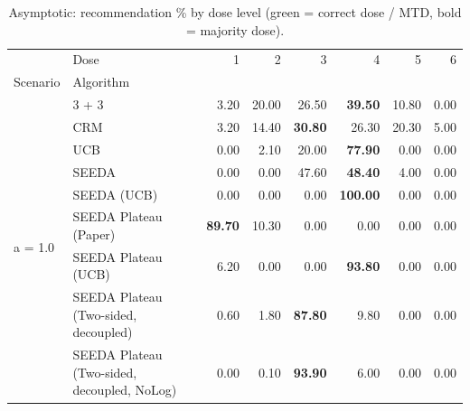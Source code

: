 \begin{table}[H]
\centering
\caption{Asymptotic: recommendation \% by dose level (green = correct dose / MTD, bold = majority dose).}
\label{tab:asym_rec_by_dose}
\begin{tabular}{llrrrrrr}
\toprule
 & Dose & 1 & 2 & 3 & 4 & 5 & 6 \\
Scenario & Algorithm &  &  &  &  &  &  \\
\midrule
\multirow[c]{9}{*}{a = 1.0} & 3 + 3 & 3.20 & 20.00 & {\cellcolor[HTML]{C8E6C9}} 26.50 & \bfseries 39.50 & 10.80 & 0.00 \\
 & CRM & 3.20 & 14.40 & {\cellcolor[HTML]{C8E6C9}} \bfseries 30.80 & 26.30 & 20.30 & 5.00 \\
 & UCB & 0.00 & 2.10 & {\cellcolor[HTML]{C8E6C9}} 20.00 & \bfseries 77.90 & 0.00 & 0.00 \\
 & SEEDA & 0.00 & 0.00 & {\cellcolor[HTML]{C8E6C9}} 47.60 & \bfseries 48.40 & 4.00 & 0.00 \\
 & SEEDA (UCB) & 0.00 & 0.00 & {\cellcolor[HTML]{C8E6C9}} 0.00 & \bfseries 100.00 & 0.00 & 0.00 \\
 & SEEDA Plateau (Paper) & \bfseries 89.70 & 10.30 & {\cellcolor[HTML]{C8E6C9}} 0.00 & 0.00 & 0.00 & 0.00 \\
 & SEEDA Plateau (UCB) & 6.20 & 0.00 & {\cellcolor[HTML]{C8E6C9}} 0.00 & \bfseries 93.80 & 0.00 & 0.00 \\
 & SEEDA Plateau (Two-sided, decoupled) & 0.60 & 1.80 & {\cellcolor[HTML]{C8E6C9}} \bfseries 87.80 & 9.80 & 0.00 & 0.00 \\
 & SEEDA Plateau (Two-sided, decoupled, NoLog) & 0.00 & 0.10 & {\cellcolor[HTML]{C8E6C9}} \bfseries 93.90 & 6.00 & 0.00 & 0.00 \\
\bottomrule
\end{tabular}
\end{table}
